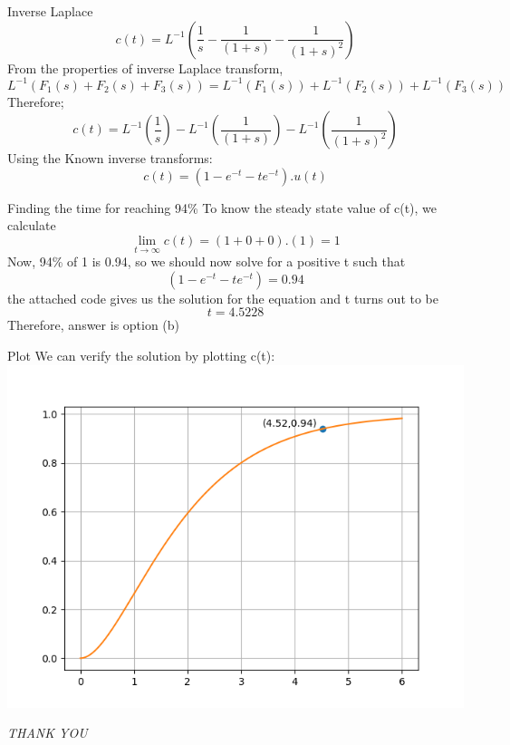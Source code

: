 \documentclass{beamer}
\begin{document}
\begin{frame}{Inverse Laplace}
$$c(t) = L^{-1} ( \frac{1}{s} - \frac{1}{(1+s)} - \frac{1}{(1+s)^2}) $$
From the properties of inverse Laplace transform,
$$L^{-1} (F_1(s) + F_2(s) + F_3(s)) = L^{-1}(F_1(s)) + L^{-1}(F_2(s)) + L^{-1}(F_3(s))$$
Therefore;
$$c(t) = L^{-1} ( \frac{1}{s}) - L^{-1}(\frac{1}{(1+s)}) - L^{-1}(\frac{1}{(1+s)^2}) $$
Using the Known inverse transforms:
$$c(t) = (1 - e^{-t} - te^{-t}) . u(t)$$


\end{frame}
\begin{frame}{Finding the time for reaching 94\%}
To know the steady state value of c(t), we calculate 
$$\lim_{t\to\infty} c(t) = (1+0+0).(1) = 1$$
Now, 94\% of 1 is 0.94, so we should now solve for a positive t such that
$$(1 - e^{-t} - te^{-t}) = 0.94$$
the attached code gives us the solution for the equation
and t turns out to be
$$ t = 4.5228$$
Therefore, answer is option (b)
\end{frame}
\begin{frame}{Plot}
We can verify the solution by plotting c(t):
\includegraphics[scale=0.65]{plot.png}
\end{frame}    
\begin{frame}{}
  \centering \Large
  \emph{THANK YOU}
\end{frame}
\end{document}
